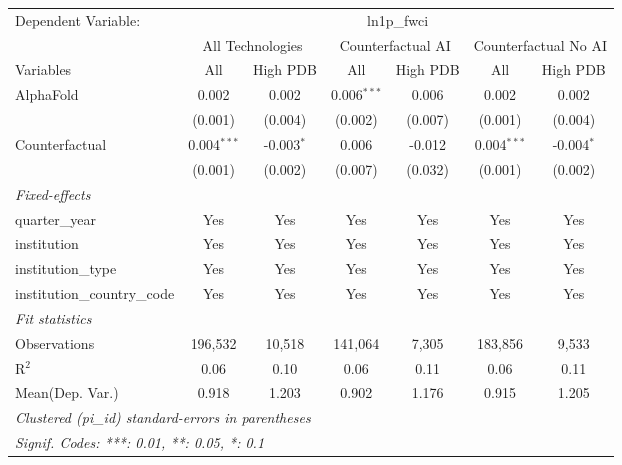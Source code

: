 \begingroup
\centering
\begin{tabular}{lcccccc}
   \tabularnewline \midrule \midrule
   Dependent Variable: & \multicolumn{6}{c}{ln1p\_fwci}\\
 & \multicolumn{2}{c}{All Technologies} & \multicolumn{2}{c}{Counterfactual AI} & \multicolumn{2}{c}{Counterfactual No AI} \\
\cmidrule(lr){1-1}\cmidrule(lr){2-3} \cmidrule(lr){4-5} \cmidrule(lr){6-7}
Variables & \multicolumn{1}{c}{All} & \multicolumn{1}{c}{High PDB} & \multicolumn{1}{c}{All} & \multicolumn{1}{c}{High PDB} & \multicolumn{1}{c}{All} & \multicolumn{1}{c}{High PDB} \\
\cmidrule(lr){1-1}\cmidrule(lr){2-2} \cmidrule(lr){3-3} \cmidrule(lr){4-4} \cmidrule(lr){5-5} \cmidrule(lr){6-6} \cmidrule(lr){7-7}
   AlphaFold                    & 0.002         & 0.002        & 0.006$^{***}$ & 0.006   & 0.002         & 0.002\\   
                                & (0.001)       & (0.004)      & (0.002)       & (0.007) & (0.001)       & (0.004)\\   
   Counterfactual               & 0.004$^{***}$ & -0.003$^{*}$ & 0.006         & -0.012  & 0.004$^{***}$ & -0.004$^{*}$\\   
                                & (0.001)       & (0.002)      & (0.007)       & (0.032) & (0.001)       & (0.002)\\   
   \midrule
   \emph{Fixed-effects}\\
   quarter\_year                & Yes           & Yes          & Yes           & Yes     & Yes           & Yes\\  
   institution                  & Yes           & Yes          & Yes           & Yes     & Yes           & Yes\\  
   institution\_type            & Yes           & Yes          & Yes           & Yes     & Yes           & Yes\\  
   institution\_country\_code   & Yes           & Yes          & Yes           & Yes     & Yes           & Yes\\  
   \midrule
   \emph{Fit statistics}\\
   Observations                 & 196,532       & 10,518       & 141,064       & 7,305   & 183,856       & 9,533\\  
   R$^2$                        & 0.06          & 0.10         & 0.06          & 0.11    & 0.06          & 0.11\\  
Mean(Dep. Var.) & 0.918 & 1.203 & 0.902 & 1.176 & 0.915 & 1.205 \\
   \midrule \midrule
   \multicolumn{7}{l}{\emph{Clustered (pi\_id) standard-errors in parentheses}}\\
   \multicolumn{7}{l}{\emph{Signif. Codes: ***: 0.01, **: 0.05, *: 0.1}}\\
\end{tabular}
\par\endgroup
